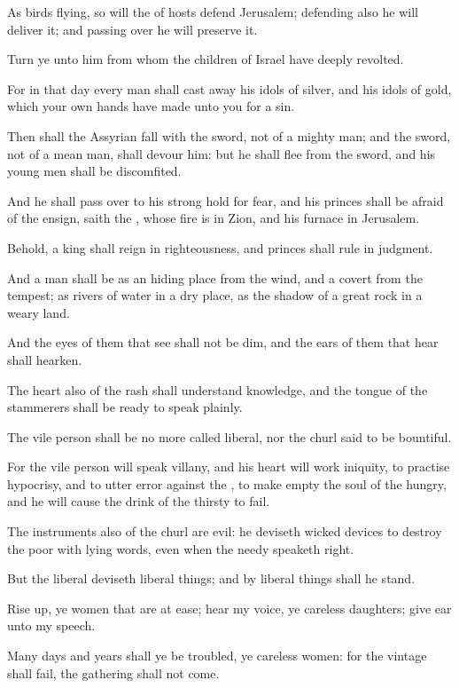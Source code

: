 \Verse As birds flying, so will the \LORD of hosts defend Jerusalem; defending also he will deliver it; and passing over he will preserve it.

\Verse Turn ye unto him from whom the children of Israel have deeply revolted.

\Verse For in that day every man shall cast away his idols of silver, and his idols of gold, which your own hands have made unto you for a sin.

\Verse Then shall the Assyrian fall with the sword, not of a mighty man; and the sword, not of a mean man, shall devour him: but he shall flee from the sword, and his young men shall be discomfited.

\Verse And he shall pass over to his strong hold for fear, and his princes shall be afraid of the ensign, saith the \LORD, whose fire is in Zion, and his furnace in Jerusalem.


\Chapter
\Verse Behold, a king shall reign in righteousness, and princes shall rule in judgment.

\Verse And a man shall be as an hiding place from the wind, and a covert from the tempest; as rivers of water in a dry place, as the shadow of a great rock in a weary land.

\Verse And the eyes of them that see shall not be dim, and the ears of them that hear shall hearken.

\Verse The heart also of the rash shall understand knowledge, and the tongue of the stammerers shall be ready to speak plainly.

\Verse The vile person shall be no more called liberal, nor the churl said to be bountiful.

\Verse For the vile person will speak villany, and his heart will work iniquity, to practise hypocrisy, and to utter error against the \LORD, to make empty the soul of the hungry, and he will cause the drink of the thirsty to fail.

\Verse The instruments also of the churl are evil: he deviseth wicked devices to destroy the poor with lying words, even when the needy speaketh right.

\Verse But the liberal deviseth liberal things; and by liberal things shall he stand.

\Verse Rise up, ye women that are at ease; hear my voice, ye careless daughters; give ear unto my speech.

\Verse Many days and years shall ye be troubled, ye careless women: for the vintage shall fail, the gathering shall not come.

